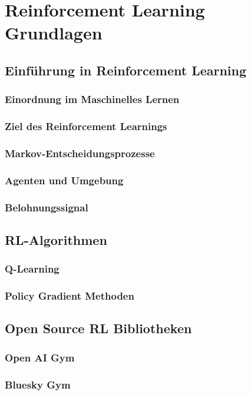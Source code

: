 \chapter{Reinforcement Learning Grundlagen}
\label{ch:rl_grundlagen}

\section{Einführung in Reinforcement Learning}
\subsection{Einordnung im Maschinelles Lernen}
\subsection{Ziel des Reinforcement Learnings}
\subsection{Markov-Entscheidungsprozesse}
\subsection{Agenten und Umgebung}
\subsection{Belohnungssignal}

\section{RL-Algorithmen}
\subsection{Q-Learning}
\subsection{Policy Gradient Methoden}

\section{Open Source RL Bibliotheken}
\subsection{Open AI Gym}
\subsection{Bluesky Gym}
